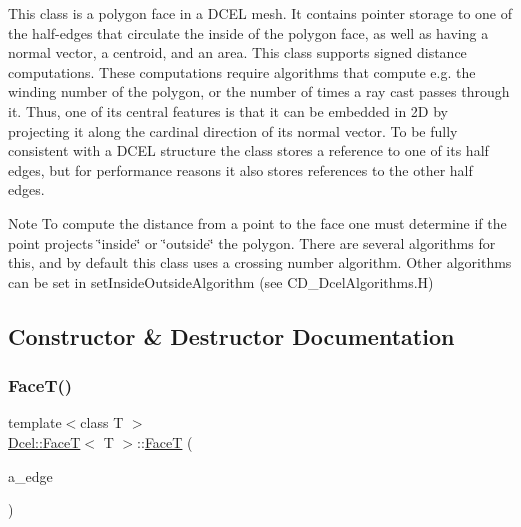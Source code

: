 This class is a polygon face in a D\+C\+EL mesh. It contains pointer storage to one of the half-\/edges that circulate the inside of the polygon face, as well as having a normal vector, a centroid, and an area. This class supports signed distance computations. These computations require algorithms that compute e.\+g. the winding number of the polygon, or the number of times a ray cast passes through it. Thus, one of its central features is that it can be embedded in 2D by projecting it along the cardinal direction of its normal vector. To be fully consistent with a D\+C\+EL structure the class stores a reference to one of its half edges, but for performance reasons it also stores references to the other half edges. \begin{DoxyNote}{Note}
To compute the distance from a point to the face one must determine if the point projects \char`\"{}inside\char`\"{} or \char`\"{}outside\char`\"{} the polygon. There are several algorithms for this, and by default this class uses a crossing number algorithm. Other algorithms can be set in set\+Inside\+Outside\+Algorithm (see C\+D\+\_\+\+Dcel\+Algorithms.\+H) 
\end{DoxyNote}


\subsection{Constructor \& Destructor Documentation}
\mbox{\label{classDcel_1_1FaceT_a9111394950a9fb2f8b918423416c83bd}} 
\subsubsection{\texorpdfstring{Face\+T()}{FaceT()}\hspace{0.1cm}{\footnotesize\ttfamily [1/2]}}
{\footnotesize\ttfamily template$<$class T $>$ \\
\hyperlink{classDcel_1_1FaceT}{Dcel\+::\+FaceT}$<$ T $>$\+::\hyperlink{classDcel_1_1FaceT}{FaceT} (\begin{DoxyParamCaption}\item[{const \hyperlink{classDcel_1_1FaceT_a0f3448c4cf108341e48029b8040c7cec}{Edge\+Ptr} \&}]{a\+\_\+edge }\end{DoxyParamCaption})\hspace{0.3cm}{\ttfamily [inline]}}



